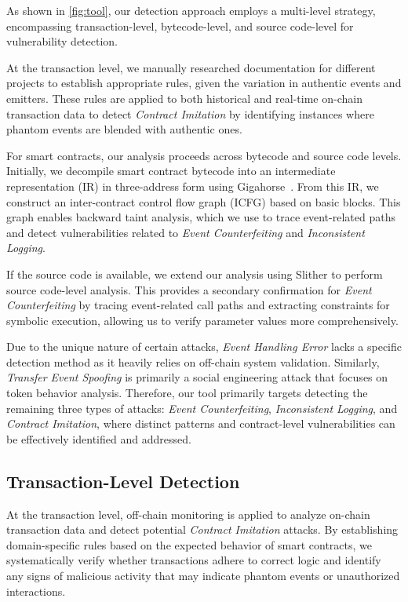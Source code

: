 As shown in \cref{fig:tool}, our detection approach employs a multi-level strategy, encompassing
transaction-level, bytecode-level, and source code-level for vulnerability detection.

At the transaction level, we manually researched documentation for different projects to establish appropriate rules, given the variation in authentic events and emitters. These rules are applied to both historical and real-time on-chain transaction data to detect \emph{Contract Imitation} by identifying instances where phantom events are blended with authentic ones.

For smart contracts, our analysis proceeds across bytecode and source code levels. Initially, we decompile smart contract bytecode into an intermediate representation (IR) in three-address form using Gigahorse~\cite{Gigahorse}. From this IR, we construct an inter-contract control flow graph (ICFG) based on basic blocks. This graph enables backward taint analysis, which we use to trace event-related paths and detect vulnerabilities related to \emph{Event Counterfeiting} and \emph{Inconsistent Logging}.

If the source code is available, we extend our analysis using Slither to perform source code-level analysis. This provides a secondary confirmation for \emph{Event Counterfeiting} by tracing event-related call paths and extracting constraints for symbolic execution, allowing us to verify parameter values more comprehensively.

Due to the unique nature of certain attacks, \emph{Event Handling Error} lacks a specific detection method as it heavily relies on off-chain system validation. Similarly, \emph{Transfer Event Spoofing} is primarily a social engineering attack that focuses on token behavior analysis. Therefore, our tool primarily targets detecting the remaining three types of attacks: \emph{Event Counterfeiting}, \emph{Inconsistent Logging}, and \emph{Contract Imitation}, where distinct patterns and contract-level vulnerabilities can be effectively identified and addressed.

\subsection{Transaction-Level Detection}
At the transaction level, off-chain monitoring is applied to analyze on-chain transaction data and detect potential \emph{Contract Imitation} attacks.
By establishing domain-specific rules based on the expected behavior of smart contracts, we systematically verify whether transactions adhere to correct logic and identify any signs of malicious activity that may indicate phantom events or unauthorized interactions.

